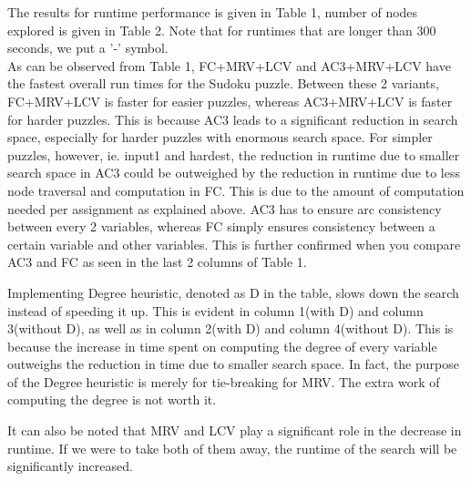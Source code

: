 \documentclass[runningheads]{llncs}
\begin{document}
 The results for runtime performance is given in Table 1, number of nodes explored is given in Table 2. Note that for runtimes that are longer than 300 seconds, we put a '-' symbol.\\

As can be observed from Table 1, FC+MRV+LCV and AC3+MRV+LCV have the fastest overall run times for the Sudoku puzzle. Between these 2 variants, FC+MRV+LCV is faster for easier puzzles, whereas AC3+MRV+LCV is faster for harder puzzles. This is because AC3 leads to a significant reduction in search space, especially for harder puzzles with enormous search space. For simpler puzzles, however, ie. input1 and hardest, the reduction in runtime due to smaller search space in AC3 could be outweighed by the reduction in runtime due to less node traversal and computation in FC. This is due to the amount of computation needed per assignment as explained above. AC3 has to ensure arc consistency between every 2 variables, whereas FC simply ensures consistency between a certain variable and other variables. This is further confirmed when you compare AC3 and FC as seen in the last 2 columns of Table 1.

Implementing Degree heuristic, denoted as D in the table, slows down the search instead of speeding it up. This is evident in column 1(with D) and column 3(without D), as well as in column 2(with D) and column 4(without D). This is because the increase in time spent on computing the degree of every variable outweighs the reduction in time due to smaller search space. In fact, the purpose of the Degree heuristic is merely for tie-breaking for MRV. The extra work of computing the degree is not worth it. 

It can also be noted that MRV and LCV play a significant role in the decrease in runtime. If we were to take both of them away, the runtime of the search will be significantly increased.  
\end{document}
